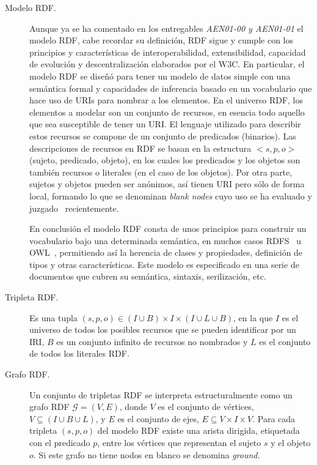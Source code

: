\begin{description}
\item [Modelo RDF.] Aunque ya se ha comentado en los entregables \textit{AEN01-00 y AEN01-01} el modelo RDF, cabe recordar su definición, RDF
sigue y cumple con los principios y características de interoperabilidad, extensibilidad, capacidad de evolución
y descentralización elaborados por el \gls{W3C}. En particular, el modelo RDF se diseñó para tener un modelo de datos
simple con una semántica formal y capacidades de inferencia basado en un vocabulario que hace uso de URIs para nombrar
a los elementos. En el universo RDF, los elementos a modelar son un conjunto de recursos, en esencia todo
aquello que sea susceptible de tener un URI. El lenguaje utilizado para describir estos recursos se compone
de un conjunto de predicados (binarios). Las descripciones de recursos en RDF se basan en la estructura
$<s,p,o>$ (sujeto, predicado, objeto), en los cuales los predicados y los objetos son también recursos o 
literales (en el caso de los objetos). Por otra parte, sujetos y objetos pueden ser anónimos, así tienen URI
pero sólo de forma local, formando lo que se denominan \textit{blank nodes} cuyo uso se ha evaluado y juzgado~\cite{DBLP:conf/semweb/MalleaAHP11} 
recientemente.

En conclusión el modelo RDF consta de unos principios para construir un vocabulario 
bajo una determinada semántica, en muchos casos RDFS~\cite{RDFS} u \gls{OWL}~\cite{owl2-primer}, permitiendo así la herencia
de clases y propiedades, definición de tipos y otras características. Este modelo
es especificado en una serie de documentos que cubren su semántica, sintaxis, serilización, etc.

\item [Tripleta RDF.] Es una tupla $(s,p,o) \in (I \cup B) \times I \times 
(I \cup L \cup B)$, en la que $I$ es el universo de todos los posibles recursos que se pueden identificar
por un IRI, $B$ es un conjunto infinito de recursos no nombrados y $L$ es el conjunto
de todos los literales RDF.

\item [Grafo RDF.] Un conjunto de tripletas RDF se interpreta estructuralmente como un grafo
RDF $\mathcal{G} =(V,E)$, donde $V$ es el conjunto de vértices, $V \subseteq (I \cup B \cup L)$,
y $E$ es el conjunto de ejes, $E \subseteq V \times I \times 
V$. Para cada tripleta $(s,p,o)$ del modelo RDF existe
una arista dirigida, etiquetada con el predicado $p$, entre los vértices que representan el sujeto $s$ y el objeto $o$. Si este
grafo no tiene nodos en blanco se denomina \textit{ground}.


\end{description}
